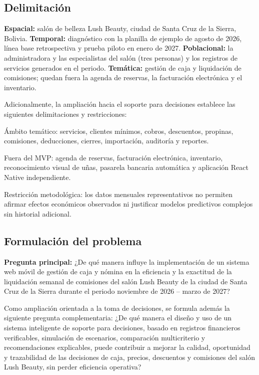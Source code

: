 \subsection{Delimitación}

\textbf{Espacial:} salón de belleza Lush Beauty, ciudad de Santa Cruz de la Sierra, Bolivia. \textbf{Temporal:} diagnóstico con la planilla de ejemplo de agosto de 2026, línea base retrospectiva y prueba piloto en enero de 2027. \textbf{Poblacional:} la administradora y las especialistas del salón (tres personas) y los registros de servicios generados en el periodo. \textbf{Temática:} gestión de caja y liquidación de comisiones; quedan fuera la agenda de reservas, la facturación electrónica y el inventario.


Adicionalmente, la ampliación hacia el soporte para decisiones establece las siguientes delimitaciones y restricciones:

\begin{vinetas}
\item Ámbito temático: servicios, clientes mínimos, cobros, descuentos, propinas, comisiones, deducciones, cierres, importación, auditoría y reportes.
\item Fuera del MVP: agenda de reservas, facturación electrónica, inventario, reconocimiento visual de uñas, pasarela bancaria automática y aplicación React Native independiente.
\item Restricción metodológica: los datos mensuales representativos no permiten afirmar efectos económicos observados ni justificar modelos predictivos complejos sin historial adicional.
\end{vinetas}

\subsection{Formulación del problema}

\textbf{Pregunta principal:} ¿De qué manera influye la implementación de un sistema web móvil de gestión de caja y nómina en la eficiencia y la exactitud de la liquidación semanal de comisiones del salón Lush Beauty de la ciudad de Santa Cruz de la Sierra durante el periodo noviembre de 2026 – marzo de 2027?


Como ampliación orientada a la toma de decisiones, se formula además la siguiente pregunta complementaria: ¿De qué manera el diseño y uso de un sistema inteligente de soporte para decisiones, basado en registros financieros verificables, simulación de escenarios, comparación multicriterio y recomendaciones explicables, puede contribuir a mejorar la calidad, oportunidad y trazabilidad de las decisiones de caja, precios, descuentos y comisiones del salón Lush Beauty, sin perder eficiencia operativa?


